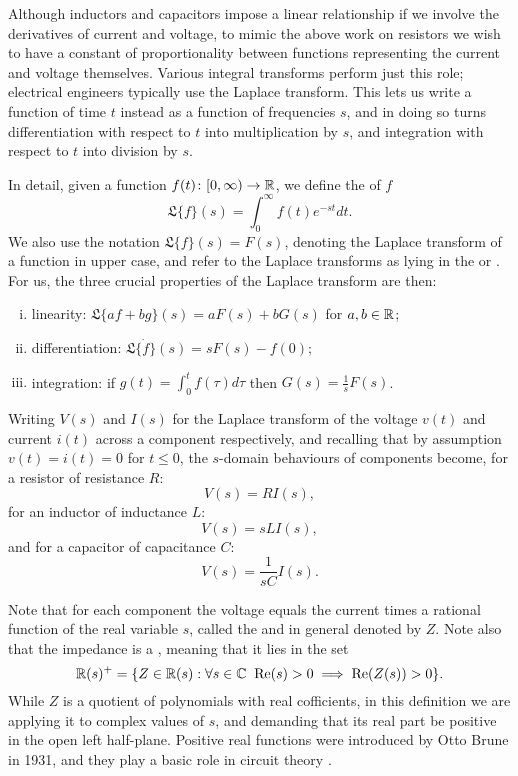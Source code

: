 Although inductors and capacitors impose a linear relationship if we involve the
derivatives of current and voltage, to mimic the above work on resistors we wish
to have a constant of proportionality between functions representing the current
and voltage themselves. Various integral transforms perform just this role; electrical
engineers typically use the Laplace transform. This lets us write a function of time $t$ instead as a function of frequencies $s$, and in doing so turns differentiation with respect to $t$ into multiplication by $s$, and integration with respect to $t$ into
division by $s$.  

In detail, given a function $f(t){\colon} [0, \infty) \to {\mathbb{R}}$, we define the
 of $f$
\[
  \mathfrak{L}\{f\}(s) = \int_{0}^\infty f(t) e^{-st} dt.
\]
We also use the notation $\mathfrak{L}\{f\}(s) = F(s)$, denoting the Laplace
transform of a function in upper case, and refer to the Laplace transforms as
lying in the  or . For us, the three
crucial properties of the Laplace transform are then: 
\begin{enumerate}[(i)]
  \item linearity: $\mathfrak{L}\{af+bg\}(s) = aF(s)+bG(s)$ for $a,b\in {\mathbb{R}}$;
  \item differentiation: $\mathfrak{L}\{\dot{f}\}(s) = s F(s) - f(0)$;
  \item integration: if $g(t) = \int_0^t f(\tau)d\tau$ then 
 $G(s) = \frac{1}{s} F(s)$.
\end{enumerate}
Writing $V(s)$ and $I(s)$ for the Laplace transform of the voltage $v(t)$ and
current $i(t)$ across a component respectively, and recalling that by assumption
$v(t) = i(t) = 0$ for $t \le 0$, the $s$-domain behaviours of components become,
for a resistor of resistance $R$:
\[
  V(s) = RI(s),
\]
for an inductor of inductance $L$:
\[
  V(s) = sLI(s),
\]
and for a capacitor of capacitance $C$:
\[
  V(s) = \frac1{sC} I(s). 
\]

Note that for each component the voltage equals the current times a rational function of
the real variable $s$, called the  and in general denoted by $Z$.
Note also that the impedance is a , meaning that it lies
in the set
\[         {\mathbb{R}}(s)^+ = \{ Z \in {\mathbb{R}}(s) : \forall s \in {\mathbb C} \;\; \mathrm{Re}(s) > 0 \implies 
\mathrm{Re}(Z(s)) > 0 \} . \]
While $Z$ is a quotient of polynomials with real cofficients, in this definition
we are applying it to complex values of $s$, and demanding that its real part be
positive in the open left half-plane.  Positive real functions were introduced by Otto 
Brune in 1931, and they play a basic role in circuit theory \cite{Brune}.  

